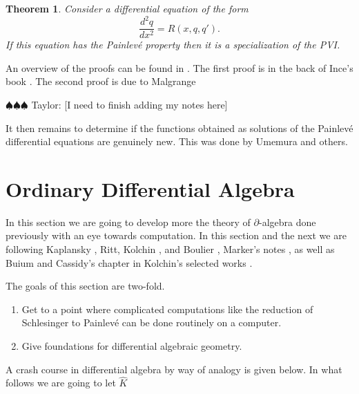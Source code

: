 \documentclass[12pt]{book}
\newcommand{\taylor}[1]{{\color{blue} \sf $\spadesuit\spadesuit\spadesuit$ Taylor: [#1]}}
\numberwithin{equation}{section}
\newtheorem{theorem}{Theorem}[subsection]
\theoremstyle{definition}
\theoremstyle{remark}
\newcommand{\Khat}{\widehat{K}}
\begin{document}
\begin{theorem}
	Consider a differential equation of the form 
	$$ \dfrac{d^2q}{dx^2} = R(x,q,q'). $$
	If this equation has the Painlev\'{e} property then it is a specialization of the PVI.
\end{theorem}

An overview of the proofs can be found in \cite{Shimomura2003}.
The first proof is in the back of Ince's book \cite{Ince1944}. 
The second proof is due to Malgrange 

\taylor{I need to finish adding my notes here}


It then remains to determine if the functions obtained as solutions of the Painlev\'e differential equations are genuinely new. 
This was done by Umemura and others. 


\chapter{Ordinary Differential Algebra}

In this section we are going to develop more the theory of $\partial$-algebra done previously with an eye towards computation. 
In this section and the next we are following Kaplansky \cite{Kaplansky1976}, Ritt\cite{Ritt1950}, Kolchin \cite{Kolchin1973}, and Boulier \cite[\href{https://hal.archives-ouvertes.fr/hal-02378197v2/document}{online version}]{Boulier2019}, Marker's notes \cite{Marker2000}, as well as Buium and Cassidy's chapter in Kolchin's selected works \cite{Kolchin1999}.

The goals of this section are two-fold. 
\begin{enumerate}
	\item Get to a point where complicated computations like the reduction of Schlesinger to Painlev\'e can be done routinely on a computer. 
	\item Give foundations for differential algebraic geometry.
\end{enumerate}

A crash course in differential algebra by way of analogy is given below. 
In what follows we are going to let $\Khat$
\end{document}
